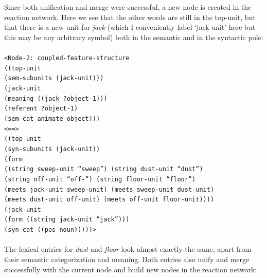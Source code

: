 Since both unification and merge were successful, a new node is created in the reaction network. Here we see that the other words are still in the top-unit, but that there is a new unit for {\em jack} (which I conveniently label `jack-unit' here but this may be any arbitrary symbol) both in the semantic and in the syntactic pole:
\\
\\
{\footnotesize{\tt <Node-2: coupled-feature-structure
\\ ((top-unit
\\ \hspace*{5mm} (sem-subunits (jack-unit)))
\\ \hspace*{2mm}(jack-unit
\\ \hspace*{5mm} (meaning ((jack ?object-1)))
\\ \hspace*{5mm} (referent ?object-1)
\\ \hspace*{5mm} (sem-cat animate-object)))
\\ <==>
\\ ((top-unit
\\ \hspace*{5mm} (syn-subunits (jack-unit))
\\ \hspace*{5mm} (form 
\\ \hspace*{10mm} ((string sweep-unit ``sweep'') (string dust-unit ``dust'') 
\\ \hspace*{11mm} (string off-unit ``off-'') (string floor-unit ``floor'') 
\\ \hspace*{11mm} (meets jack-unit sweep-unit) (meets sweep-unit dust-unit) 
\\ \hspace*{11mm} (meets dust-unit off-unit) (meets off-unit floor-unit))))
\\ \hspace*{2mm}(jack-unit
\\ \hspace*{5mm} (form ((string jack-unit ``jack'')))
\\ \hspace*{5mm} (syn-cat ((pos noun)))))>}}
\\
\\
The lexical entries for {\em dust} and {\em floor} look almost exactly the same, apart from their semantic categorization and meaning. Both entries also unify and merge successfully with the current node and build new nodes in the reaction network: 
